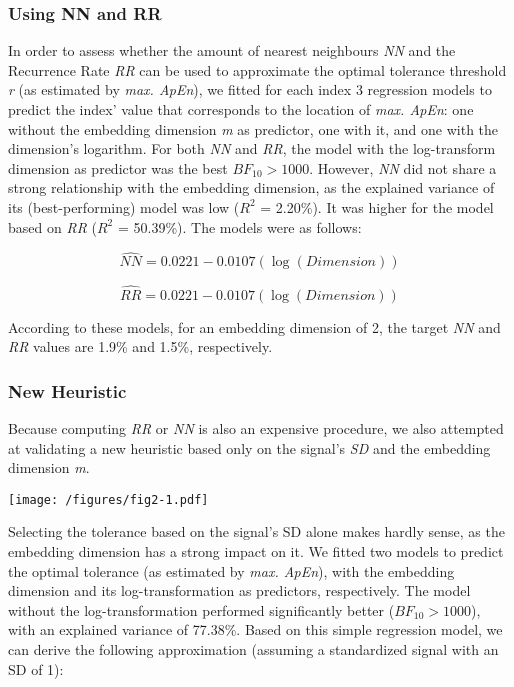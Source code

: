 \documentclass[
  man]{apa6}
\begin{document}
\hypertarget{using-nn-and-rr}{%
\subsubsection{Using NN and RR}\label{using-nn-and-rr}}

In order to assess whether the amount of nearest neighbours \emph{NN} and the Recurrence Rate \emph{RR} can be used to approximate the optimal tolerance threshold \emph{r} (as estimated by \emph{max. ApEn}), we fitted for each index 3 regression models to predict the index' value that corresponds to the location of \emph{max. ApEn}: one without the embedding dimension \emph{m} as predictor, one with it, and one with the dimension's logarithm. For both \emph{NN} and \emph{RR}, the model with the log-transform dimension as predictor was the best \(BF_{10} > 1000\). However, \emph{NN} did not share a strong relationship with the embedding dimension, as the explained variance of its (best-performing) model was low (\(R^2\) = 2.20\%). It was higher for the model based on \emph{RR} (\(R^2\) = 50.39\%). The models were as follows:

\begin{equation}
\widehat{NN} = 0.0221 - 0.0107(\log(Dimension))
\end{equation}

\begin{equation}
\widehat{RR} = 0.0221 - 0.0107(\log(Dimension))
\end{equation}

According to these models, for an embedding dimension of 2, the target \emph{NN} and \emph{RR} values are 1.9\% and 1.5\%, respectively.

\hypertarget{new-heuristic}{%
\subsubsection{New Heuristic}\label{new-heuristic}}

Because computing \emph{RR} or \emph{NN} is also an expensive procedure, we also attempted at validating a new heuristic based only on the signal's \emph{SD} and the embedding dimension \emph{m}.

\texttt{[image: /figures/fig2-1.pdf]}

Selecting the tolerance based on the signal's SD alone makes hardly sense, as the embedding dimension has a strong impact on it. We fitted two models to predict the optimal tolerance (as estimated by \emph{max. ApEn}), with the embedding dimension and its log-transformation as predictors, respectively. The model without the log-transformation performed significantly better (\(BF_{10} > 1000\)), with an explained variance of 77.38\%. Based on this simple regression model, we can derive the following approximation (assuming a standardized signal with an SD of 1):
\end{document}
